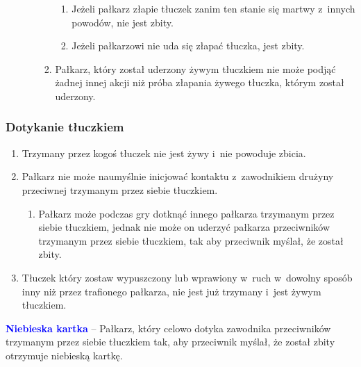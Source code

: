 \documentclass[12pt,a4paper]{article}
\newcommand\bluecard[1]{\bgroup\textcolor{blue}{\textbf{#1}}}
\begin{document}
\begin{enumerate}
\begin{enumerate}
\begin{enumerate}
			                  \begin{enumerate}
				                  \item
				                        Jeżeli pałkarz złapie tłuczek zanim ten stanie się martwy z~innych powodów, nie jest zbity.
				                  \item
				                        Jeżeli pałkarzowi nie uda się złapać tłuczka, jest zbity.
			                  \end{enumerate}
			            \item
			                  Pałkarz, który został uderzony żywym tłuczkiem nie może podjąć
			                  żadnej innej akcji niż próba złapania żywego tłuczka, którym
			                  został uderzony.
		            \end{enumerate}
	      \end{enumerate}
\end{enumerate}

\subsubsection{Dotykanie tłuczkiem}

\begin{enumerate}
	\item
	      Trzymany przez kogoś tłuczek nie jest żywy i~nie powoduje zbicia.
	\item
	      Pałkarz nie może naumyślnie inicjować kontaktu z~zawodnikiem drużyny
	      przeciwnej trzymanym przez siebie tłuczkiem.

	      \begin{enumerate}
		      \item
		            Pałkarz może podczas gry dotknąć innego pałkarza trzymanym przez
		            siebie tłuczkiem, jednak nie może on uderzyć pałkarza przeciwników
		            trzymanym przez siebie tłuczkiem, tak aby przeciwnik myślał, że
		            został zbity.
	      \end{enumerate}
	\item
	      Tłuczek który zostaw wypuszczony lub wprawiony w~ruch w~dowolny sposób
	      inny niż przez trafionego pałkarza, nie jest już trzymany i~jest żywym
	      tłuczkiem.
\end{enumerate}

\bluecard{Niebieska kartka} -- Pałkarz, który celowo dotyka zawodnika
przeciwników trzymanym przez siebie tłuczkiem tak, aby przeciwnik
myślał, że został zbity otrzymuje niebieską kartkę.
\end{document}

